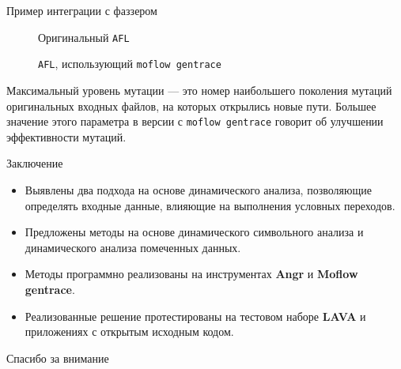 \documentclass[10pt]{beamer}
\begin{document}
\begin{frame}{Пример интеграции с фаззером}
\begin{figure}[H]
    \caption{\tiny{Оригинальный \texttt{AFL}}}
\end{figure}
\begin{figure}[H]
      \caption{\tiny{\texttt{AFL}, использующий \texttt{moflow gentrace}}}
\end{figure}
  \small{Максимальный уровень мутации --- это номер наибольшего поколения мутаций оригинальных входных файлов, на которых открылись новые пути. Большее значение этого параметра в версии с \texttt{moflow gentrace} говорит об улучшении эффективности мутаций}.
\end{frame}

\begin{frame}{Заключение}

\begin{itemize}
\item Выявлены два подхода на основе динамического анализа, позволяющие определять входные данные, влияющие на выполнения условных переходов.
\item Предложены методы на основе динамического символьного анализа и динамического анализа помеченных данных.
\item Методы программно реализованы на инструментах \textbf{Angr} и \textbf{Moflow gentrace}.
\item Реализованные решение протестированы на тестовом наборе \textbf{LAVA} и приложениях с открытым исходным кодом.
\end{itemize}


\end{frame}

\begin{frame}[standout] \vfill Спасибо за внимание \vfill \end{frame}

\end{document}

